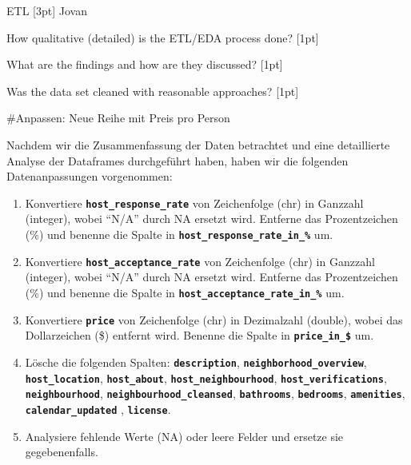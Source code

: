 \documentclass[
  journal,
]{IEEEtran}%
\begin{document}
ETL {[}3pt{]} Jovan

How qualitative (detailed) is the ETL/EDA process done? {[}1pt{]}

What are the findings and how are they discussed? {[}1pt{]}

Was the data set cleaned with reasonable approaches? {[}1pt{]}

\#Anpassen: Neue Reihe mit Preis pro Person

Nachdem wir die Zusammenfassung der Daten betrachtet und eine
detaillierte Analyse der Dataframes durchgeführt haben, haben wir die
folgenden Datenanpassungen vorgenommen:

\begin{enumerate}
\def\labelenumi{\arabic{enumi}.}
\item
  Konvertiere \textbf{\texttt{host\_response\_rate}} von Zeichenfolge
  (chr) in Ganzzahl (integer), wobei ``N/A'' durch NA ersetzt wird.
  Entferne das Prozentzeichen (\%) und benenne die Spalte in
  \textbf{\texttt{host\_response\_rate\_in\_\%}} um.
\item
  Konvertiere \textbf{\texttt{host\_acceptance\_rate}} von Zeichenfolge
  (chr) in Ganzzahl (integer), wobei ``N/A'' durch NA ersetzt wird.
  Entferne das Prozentzeichen (\%) und benenne die Spalte in
  \textbf{\texttt{host\_acceptance\_rate\_in\_\%}} um.
\item
  Konvertiere \textbf{\texttt{price}} von Zeichenfolge (chr) in
  Dezimalzahl (double), wobei das Dollarzeichen (\$) entfernt wird.
  Benenne die Spalte in \textbf{\texttt{price\_in\_\$}} um.
\item
  Lösche die folgenden Spalten: \textbf{\texttt{description}},
  \textbf{\texttt{neighborhood\_overview}},
  \textbf{\texttt{host\_location}}, \textbf{\texttt{host\_about}},
  \textbf{\texttt{host\_neighbourhood}},
  \textbf{\texttt{host\_verifications}},
  \textbf{\texttt{neighbourhood}},
  \textbf{\texttt{neighbourhood\_cleansed}},
  \textbf{\texttt{bathrooms}}, \textbf{\texttt{bedrooms}},
  \textbf{\texttt{amenities}}, \textbf{\texttt{calendar\_updated}} ,
  \textbf{\texttt{license}}.
\item
  Analysiere fehlende Werte (NA) oder leere Felder und ersetze sie
  gegebenenfalls.
\end{enumerate}
\end{document}
